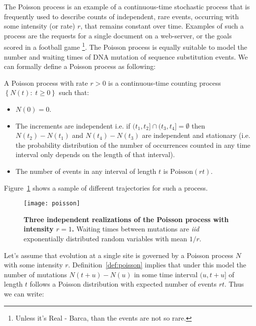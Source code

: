 The Poisson process is an example of a continuous-time stochastic process that is frequently used to describe counts of independent, rare events, occurring with some intensity (or rate) $r$, that remains constant over time. 
Examples of such a process are the requests for a single document on a web-server, or the goals scored in a football game \footnote{Unless it's Real - Barca, than the events are not so rare.}. %
The Poisson process is equally suitable to model the number and waiting times of DNA mutation of sequence substitution events. 
We can formally define a Poisson process as following:

\begin{definition} 
A Poisson process with rate $r>0$ is a continuous-time counting process $\left\{ N(t):\; t\geq0\right\}$ such that:

\begin{itemize}
\item $N(0)=0$.
\item The increments are independent i.e. if $(t_{1},t_{2}]\cap(t_{3},t_{4}]=\emptyset$ then $N(t_2)-N(t_1)$ and $N(t_4)-N(t_3)$ are independent and stationary (i.e. the probability distribution of the number of occurrences counted in any time interval only depends on the length of that interval).
\item The number of events in any interval of length $t$ is $\text{Poisson}(r t)$.
\end{itemize}

\label{def:poisson}
\end{definition}

Figure~\ref{fig:poisson} shows a sample of different trajectories for such a process.

\begin{figure}[H]
\centering
\texttt{[image: poisson]}
\caption{
{ \footnotesize 
{\bf Three independent realizations of the Poisson process with intensity $r=1$.}
Waiting times between mutations are \emph{iid} exponentially distributed random variables with mean $1/r$.
} %
}
\label{fig:poisson}
\end{figure}

Let's assume that evolution at a single site is governed by a Poisson process $N$ with some intensity $r$.
Definition~\ref{def:poisson} implies that under this model the number of mutations $N(t+u)-N(u)$ in some time interval $(u,t+u]$ of length $t$ follows a Poisson distribution with expected number of events $r t$.
Thus we can write:

